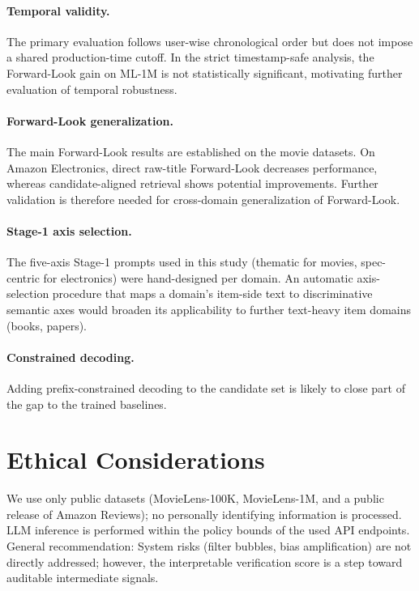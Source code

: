 \documentclass[11pt]{article}
\begin{document}
\paragraph{Temporal validity.} The primary evaluation follows user-wise chronological order but does not impose a shared production-time cutoff. In the strict timestamp-safe analysis, the Forward-Look gain on ML-1M is not statistically significant, motivating further evaluation of temporal robustness.

\paragraph{Forward-Look generalization.} The main Forward-Look results are established on the movie datasets. On Amazon Electronics, direct raw-title Forward-Look decreases performance, whereas candidate-aligned retrieval shows potential improvements. Further validation is therefore needed for cross-domain generalization of Forward-Look.

\paragraph{Stage-1 axis selection.} The five-axis Stage-1 prompts used in this study (thematic for movies, spec-centric for electronics) were hand-designed per domain. An automatic axis-selection procedure that maps a domain's item-side text to discriminative semantic axes would broaden its applicability to further text-heavy item domains (books, papers). 

\paragraph{Constrained decoding.} Adding prefix-constrained decoding to the candidate set is likely to close part of the gap to the trained baselines.

\section*{Ethical Considerations}
We use only public datasets (MovieLens-100K, MovieLens-1M, and a public release of Amazon Reviews); no personally identifying information is processed. LLM inference is performed within the policy bounds of the used API endpoints. General recommendation: System risks (filter bubbles, bias amplification) are not directly addressed; however, the interpretable verification score is a step toward auditable intermediate signals.
\end{document}
